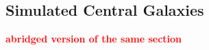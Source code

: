 \documentclass[12pt, letterpaper, preprint]{aastex}
\newcommand{\todo}[1]{{\bf \textcolor{red}{#1}}}
\begin{document}
\subsection{Simulated Central Galaxies}
\todo{abridged version of the same section}
\cite{davis1985}
\cite{hahn2017a}
\cite{li2009}
\end{document}
